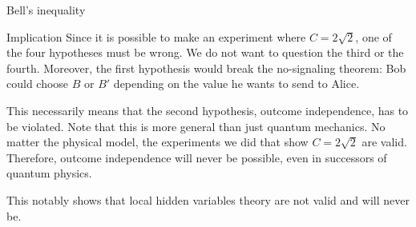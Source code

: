 \documentclass[a4paper]{article}
\begin{document}
\begin{parag}{Bell's inequality}
    \begin{subparag}{Implication}
        Since it is possible to  make an experiment where $C = 2 \sqrt{2}$, one of the four hypotheses must be wrong. We do not want to question the third or the fourth. Moreover, the first hypothesis would break the no-signaling theorem: Bob could choose $B$ or $B'$ depending on the value he wants to send to Alice.

        This necessarily means that the second hypothesis, outcome independence, has to be violated. Note that this is more general than just quantum mechanics. No matter the physical model, the experiments we did that show $C = 2 \sqrt{2}$ are valid. Therefore, outcome independence will never be possible, even in successors of quantum physics. 

        This notably shows that local hidden variables theory are not valid and will never be.
    \end{subparag}
\end{parag}
\end{document}
